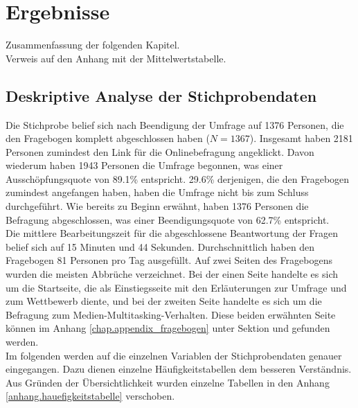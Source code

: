 %
%
\let\raggedsection\centering 
\chapter{Ergebnisse}
\let\raggedsection\raggedright 
\glsresetall
Zusammenfassung der folgenden Kapitel.\\
Verweis auf den Anhang mit der Mittelwertstabelle.
\section{Deskriptive Analyse der Stichprobendaten}
\label{label.stichprobe}
Die Stichprobe belief sich nach Beendigung der Umfrage auf 1376 Personen, die den Fragebogen komplett abgeschlossen haben ($N = 1367$). Insgesamt haben 2181 Personen zumindest den Link für die Onlinebefragung angeklickt. Davon wiederum haben 1943 Personen die Umfrage begonnen, was einer Ausschöpfungsquote von 89.1\% entspricht. 29.6\% derjenigen, die den Fragebogen zumindest angefangen haben, haben die Umfrage nicht bis zum Schluss durchgeführt. Wie bereits zu Beginn erwähnt, haben 1376 Personen die Befragung abgeschlossen, was einer Beendigungsquote von 62.7\% entspricht.\\
Die mittlere Bearbeitungszeit für die abgeschlossene Beantwortung der Fragen belief sich auf 15 Minuten und 44 Sekunden. Durchschnittlich haben den Fragebogen 81 Personen pro Tag ausgefüllt. Auf zwei Seiten des Fragebogens wurden die meisten Abbrüche verzeichnet. Bei der einen Seite handelte es sich um die Startseite, die als Einstiegsseite mit den Erläuterungen zur Umfrage und zum Wettbewerb diente, und bei der zweiten Seite handelte es sich um die Befragung zum Medien-Multitasking-Verhalten. Diese beiden erwähnten Seite können im Anhang \ref{chap.appendix_fragebogen} unter Sektion  und  gefunden werden.\\
Im folgenden werden auf die einzelnen Variablen der Stichprobendaten genauer eingegangen. Dazu dienen einzelne Häufigkeitstabellen dem besseren Verständnis. Aus Gründen der Übersichtlichkeit wurden einzelne Tabellen in den Anhang \ref{anhang.hauefigkeitstabelle} verschoben.
